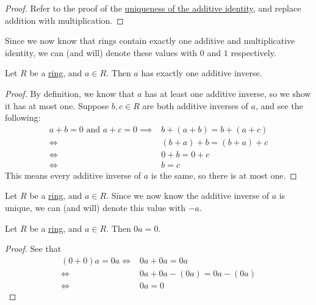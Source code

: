 \documentclass{scrartcl}
\begin{document}
\begin{proof}
    Refer to the proof of the \hyperref[prop:unique additive identity]{uniqueness of the additive identity}, and
    replace addition with multiplication.
\end{proof}

\begin{remark}
    Since we now know that rings contain exactly one additive and multiplicative identity, we can (and will) denote
    these values with $0$ and $1$ respectively.
\end{remark}

\begin{proposition}
    \label{prop:unique additive inverse}
    Let $R$ be a \hyperref[def:ring]{ring}, and $a\in R$.
    Then $a$ has exactly one additive inverse.
\end{proposition}

\begin{proof}
    By definition, we know that $a$ has at least one additive inverse, so we show it has at most one.
    Suppose $b,c\in R$ are both additive inverses of $a$, and see the following:
    \begin{align}
        a+b=0\text{ and }a+c=0
        \implies& b+(a+b)=b+(a+c) \\
        \iff& (b+a)+b=(b+a)+c \\
        \iff& 0+b=0+c \\
        \iff& b=c
    \end{align}
    This means every additive inverse of $a$ is the same, so there is at most one.
\end{proof}

\begin{remark}
    Let $R$ be a \hyperref[def:ring]{ring}, and $a\in R$.
    Since we now know the additive inverse of $a$ is unique, we can (and will) denote this value with $-a$.
\end{remark}

\begin{proposition}
    \label{prop:multiply by zero}
    Let $R$ be a \hyperref[def:ring]{ring}, and $a\in R$.
    Then $0a=0$.
\end{proposition}

\begin{proof}
    See that
    \begin{align}
        (0+0)a=0a
        \iff& 0a+0a=0a \\
        \iff& 0a+0a-(0a)=0a-(0a) \\
        \iff& 0a=0
    \end{align}
\end{proof}
\end{document}
